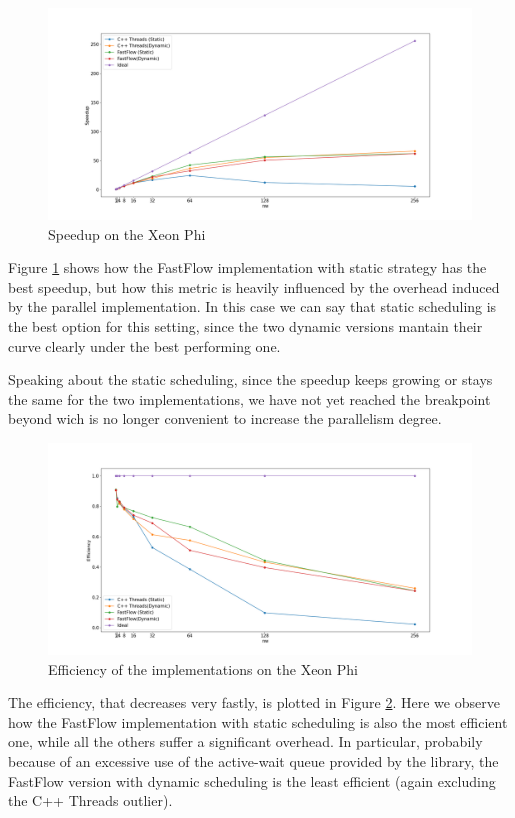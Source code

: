 \documentclass[a4paper]{article}
\begin{document}
\begin{figure}
    \centering
    \includegraphics[width=\textwidth]{plots/speedup.png}
    \caption{Speedup on the Xeon Phi}
    \label{fig:speedup}
\end{figure}

Figure \ref{fig:speedup} shows how the FastFlow implementation with static strategy has the best speedup, but how this metric is heavily influenced by the overhead induced by the parallel implementation. In this case we can say that static scheduling is the best option for this setting, since the two dynamic versions mantain their curve clearly under the best performing one.

Speaking about the static scheduling, since the speedup keeps growing or stays the same for the two implementations, we have not yet reached the breakpoint beyond wich is no longer convenient to increase the parallelism degree.

\begin{figure}
    \centering
    \includegraphics[width=\textwidth]{plots/efficiency.png}
    \caption{Efficiency of the implementations on the Xeon Phi}
    \label{fig:efficiency}
\end{figure}

The efficiency, that decreases very fastly, is plotted in Figure \ref{fig:efficiency}. Here we observe how the FastFlow implementation with static scheduling is also the most efficient one, while all the others suffer a significant overhead. In particular, probabily because of an excessive use of the active-wait queue provided by the library, the FastFlow version with dynamic scheduling is the least efficient (again excluding the C++ Threads outlier).
\end{document}
